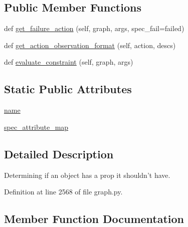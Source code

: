 \subsection*{Public Member Functions}
\begin{DoxyCompactItemize}
\item 
def \hyperlink{classlight__chats_1_1graph_1_1NoPropConstraint_ad9fd1275af02f384bd55ceaebc6ee59c}{get\+\_\+failure\+\_\+action} (self, graph, args, spec\+\_\+fail=\textquotesingle{}failed\textquotesingle{})
\item 
def \hyperlink{classlight__chats_1_1graph_1_1NoPropConstraint_a7d3ef98c6d1eea452e44c426a9498015}{get\+\_\+action\+\_\+observation\+\_\+format} (self, action, descs)
\item 
def \hyperlink{classlight__chats_1_1graph_1_1NoPropConstraint_a9a109d3e7b10297b01d79409838be126}{evaluate\+\_\+constraint} (self, graph, args)
\end{DoxyCompactItemize}
\subsection*{Static Public Attributes}
\begin{DoxyCompactItemize}
\item 
\hyperlink{classlight__chats_1_1graph_1_1NoPropConstraint_a203bf64e3c9ae237a63a23a893df6a0f}{name}
\item 
\hyperlink{classlight__chats_1_1graph_1_1NoPropConstraint_a10464e1a8f8bc8216bd0d36c9cdd38dd}{spec\+\_\+attribute\+\_\+map}
\end{DoxyCompactItemize}


\subsection{Detailed Description}
\begin{DoxyVerb}Determining if an object has a prop it shouldn't have.
\end{DoxyVerb}
 

Definition at line 2568 of file graph.\+py.



\subsection{Member Function Documentation}
\mbox{\label{classlight__chats_1_1graph_1_1NoPropConstraint_a9a109d3e7b10297b01d79409838be126}} 
